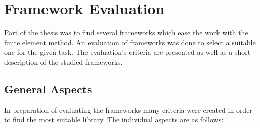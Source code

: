 \section{Framework Evaluation}
Part of the thesis was to find several frameworks which ease the work with the finite element method. An evaluation of frameworks was done to select a suitable one for the given task. The evaluation's criteria are presented as well as a short description of the studied frameworks.
 
 
 
 \subsection{General Aspects}
 In preparation of evaluating the frameworks many criteria were created in order to find the most suitable library. The individual aspects are as follows:
